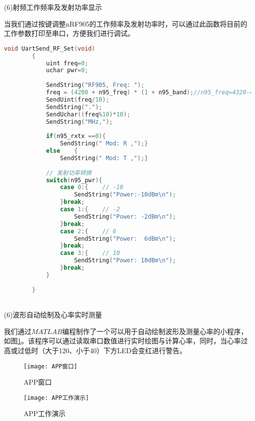 \documentclass{zjureport}
\begin{document}
	\newpage
	
	(6)射频工作频率及发射功率显示
	
	当我们通过按键调整nRF905的工作频率及发射功率时，可以通过此函数将目前的工作参数打印至串口，方便我们进行调试。
	
	\begin{lstlisting}[language=C]
		void UartSend_RF_Set(void)
		{
			uint freq=0;
			uchar pwr=0;
			
			SendString("RF905, Freq: ");
			freq = (4200 + n95_freq) * (1 + n95_band);//n95_freq=4320-4200
			SendUint(freq/10);
			SendString(".");
			SendUchar((freq%10)*10);
			SendString("MHz,");
			
			if(n95_rxtx ==0){
				SendString(" Mod: R ,");}
			else	{
				SendString(" Mod: T ,");}
			
			// 发射功率转换
			switch(n95_pwr){
				case 0:{	// -10
					SendString("Power:-10dBm\n");
				}break;
				case 1:{	// -2
					SendString("Power: -2dBm\n");
				}break;
				case 2:{	// 6
					SendString("Power:  6dBm\n");
				}break;
				case 3:{	// 10
					SendString("Power: 10dBm\n");
				}break;
			}
			
		}
	\end{lstlisting} 

	~\\
	
	(6)波形自动绘制及心率实时测量
	
	我们通过$MATLAB$编程制作了一个可以用于自动绘制波形及测量心率的小程序，如图\ref{APP窗口}。该程序可以通过读取串口数值进行实时绘图与计算心率，同时，当心率过高或过低时（大于120、小于40）下方LED会变红进行警告。
	
	\begin{figure}[H]
		\centering%
		\texttt{[image: APP窗口]}
		\caption{APP窗口}%
		\label{APP窗口}%
	\end{figure}

\begin{figure}[H]
	\centering%
	\texttt{[image: APP工作演示]}
	\caption{APP工作演示}%
	\label{APP工作演示}%
\end{figure}
	
	\newpage
	
\end{document}

